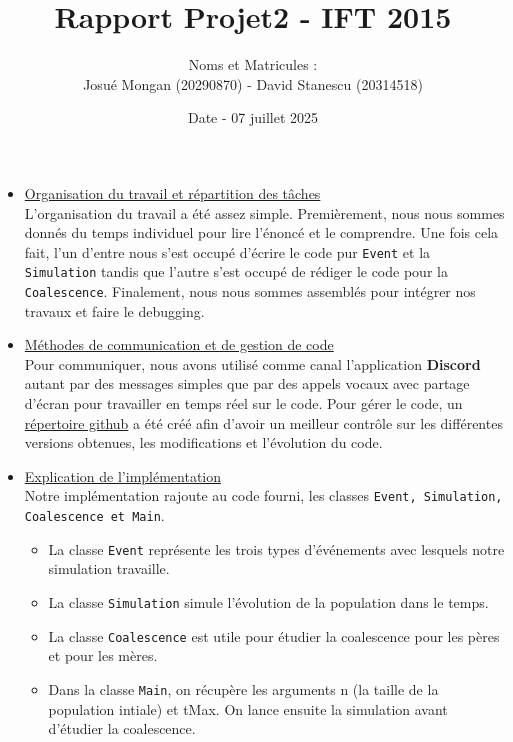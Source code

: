 \documentclass[11pt]{article}
\title{Rapport Projet2 - IFT 2015}
\author{ Noms et Matricules : \vspace{0.2cm}\\
	Josué Mongan (20290870) - David Stanescu (20314518)}
\date{Date - 07 juillet 2025}
\begin{document}
	\maketitle	
	\pagebreak
	
	
	\begin{itemize}
		
		\item \underline{Organisation du travail et répartition des tâches}  \vspace{0.2cm}\\
		L'organisation du travail a été assez simple. Premièrement, nous nous sommes donnés du temps individuel pour lire l'énoncé et le comprendre. Une fois cela fait, l'un d'entre nous s'est occupé d'écrire le code pur \texttt{Event} et la \texttt{Simulation} tandis que l'autre s'est occupé de rédiger le code pour la \texttt{Coalescence}. Finalement, nous nous sommes assemblés pour intégrer nos travaux et faire le debugging.
		
		\item \underline{Méthodes de communication et de gestion de code} \vspace{0.2cm}\\
		Pour communiquer, nous avons utilisé comme canal l'application \textbf{Discord} autant par des messages simples que par des appels vocaux avec partage d'écran pour travailler en temps réel sur le code. Pour gérer le code, un \href{https://github.com/Josh012006/Projet2-IFT2015}{répertoire github} a été créé afin d'avoir un meilleur contrôle sur les différentes versions obtenues, les modifications et l'évolution du code.
		
		\item \underline{Explication de l'implémentation} \vspace{0.2cm}\\
		Notre implémentation rajoute au code fourni, les classes \texttt{Event,  Simulation, Coalescence et Main}. 
		\begin{itemize}
			\item La classe \texttt{Event} représente les trois types d'événements avec lesquels notre simulation travaille.
			\item La classe \texttt{Simulation} simule l'évolution de la population dans le temps.
			\item La classe \texttt{Coalescence} est utile pour étudier la coalescence pour les pères et pour les mères.
			\item Dans la classe \texttt{Main}, on récupère les arguments n (la taille de la population intiale) et tMax. On lance ensuite la simulation avant d'étudier la coalescence.
		\end{itemize}
		

\end{itemize}
\end{document}
